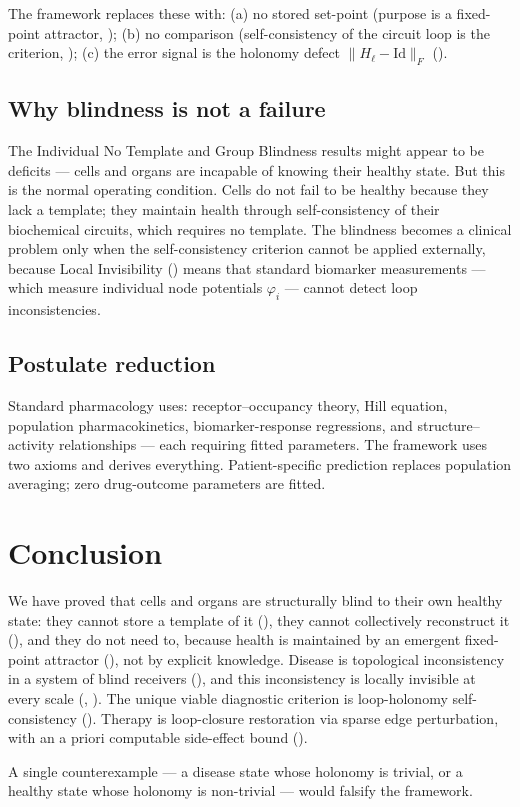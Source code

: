\documentclass[twocolumn,11pt,a4paper]{article}
\newcommand{\HolL}{H_\ell}
\begin{document}
The framework replaces these with:
(a) no stored set-point (purpose is a fixed-point attractor,
); (b) no comparison (self-consistency of the circuit
loop is the criterion, ); (c) the error
signal is the holonomy defect $\|\HolL - \mathrm{Id}\|_F$
().

\subsection{Why blindness is not a failure}

The Individual No Template and Group Blindness results might appear to be
deficits --- cells and organs are incapable of knowing their healthy state.
But this is the normal operating condition. Cells do not fail to be
healthy because they lack a template; they maintain health through
self-consistency of their biochemical circuits, which requires no template.
The blindness becomes a clinical problem only when the self-consistency
criterion cannot be applied externally, because Local Invisibility
() means that standard biomarker measurements ---
which measure individual node potentials $\varphi_i$ --- cannot detect
loop inconsistencies.

\subsection{Postulate reduction}

Standard pharmacology uses: receptor--occupancy theory, Hill equation,
population pharmacokinetics, biomarker-response regressions, and structure--activity
relationships --- each requiring fitted parameters. The framework uses two axioms and
derives everything. Patient-specific prediction replaces population averaging;
zero drug-outcome parameters are fitted.

\section{Conclusion}
\label{sec:conclusion}

We have proved that cells and organs are structurally blind to their own
healthy state: they cannot store a template of it (),
they cannot collectively reconstruct it (),
and they do not need to, because health is maintained by an emergent
fixed-point attractor (), not by
explicit knowledge. Disease is topological inconsistency in a system of
blind receivers (), and this inconsistency is
locally invisible at every scale (,
). The unique viable diagnostic criterion is
loop-holonomy self-consistency (). Therapy is loop-closure
restoration via sparse edge perturbation, with an a priori computable
side-effect bound ().

A single counterexample --- a disease state whose holonomy is trivial,
or a healthy state whose holonomy is non-trivial --- would falsify
the framework.



\end{document}

